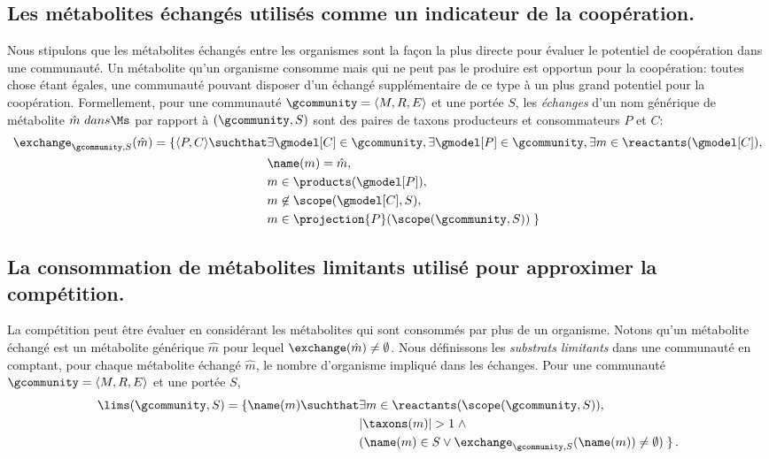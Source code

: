 \subsection{Les métabolites échangés utilisés comme un indicateur de la coopération.} Nous stipulons que les métabolites échangés entre les organismes sont la façon la plus directe pour évaluer le potentiel de coopération dans une communauté. Un métabolite qu'un organisme consomme mais qui ne peut pas le produire est opportun pour la coopération: toutes chose étant égales, une communauté pouvant disposer d'un échangé supplémentaire de ce type à un plus grand potentiel pour la coopération. Formellement, pour une communauté $\gcommunity = \langle M, R, E\rangle$ et une portée $S$, les \emph{échanges} d'un nom générique de métabolite $\hat{m}\ dans \Ms$ par rapport à $(\gcommunity, S)$ sont des paires de taxons producteurs et consommateurs $P$ et $C$:
\[
\begin{split}
\exchange_{\gcommunity, S}(\hat{m}) = \{ \langle P, C \rangle \suchthat 
    &   \exists \gmodel[C]\in\gcommunity,
        \exists \gmodel[P]\in\gcommunity,
        \exists m \in \reactants(\gmodel[C]), \\
    & \name(m) = \hat{m}, \\
    & m \in \products(\gmodel[P]), \\
    & m \not\in \scope(\gmodel[C],S), \\
    & m \in \projection{P}(\scope(\gcommunity, S)) \;\} \\
\end{split}
\]

\subsection{La consommation de métabolites limitants utilisé pour approximer la compétition.} La compétition peut être évaluer en considérant les métabolites qui sont consommés par plus de un organisme. Notons qu'un métabolite échangé est un métabolite générique $\hat{m}$ pour lequel \(
\exchange(\hat{m}) \neq\emptyset
\). Nous définissons les \emph{substrats limitants} dans une communauté en comptant, pour chaque métabolite échangé $\hat{m}$, le nombre d'organisme impliqué dans les échanges. Pour une communauté $\gcommunity = \langle M, R, E\rangle$  et une portée $S$, 
\[
\begin{split}
\lims(\gcommunity, S) = \{ \name(m) \suchthat
    & \exists m\in \reactants(\scope(\gcommunity, S)), \\
    & \vert \taxons(m) \vert > 1 \;\wedge \\
    & (\name(m) \in S \vee 
      \exchange_{\gcommunity,S}(\name(m)) \neq\emptyset) \;\} \, . \\
\end{split}
\]

